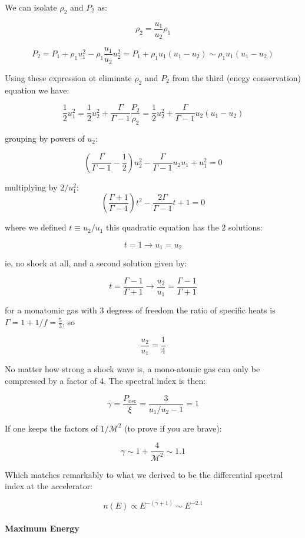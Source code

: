 \documentclass[
  letterpaper,
  DIV=11,
  numbers=noendperiod]{scrreprt}
\let\oldparagraph\paragraph
\renewcommand{\paragraph}[1]{\oldparagraph{#1}\mbox{}}
\begin{document}
We can isolate \(\rho_2\) and \(P_2\) as:

\[\rho_2 = \frac{u_1}{u_2} \rho_1\]

\[P_2 = P_1 + \rho_1 u_1^2 - \rho_1 \frac{u_1}{u_2}u_2^2 = P_1 + \rho_1 u_1 (u_1 - u_2) \sim \rho_1 u_1 (u_1 - u_2)\]

Using these expression ot eliminate \(\rho_2\) and \(P_2\) from the
third (enegy conservation) equation we have:

\[\frac{1}{2}u_1^2 = \frac{1}{2}u_2^2 + \frac{\Gamma}{\Gamma -1}\frac{P_2}{\rho_2} = \frac{1}{2}u_2^2 + \frac{\Gamma}{\Gamma -1} u_2 (u_1 - u_2)\]

grouping by powers of \(u_2\):

\[\left(\frac{\Gamma}{\Gamma -1} - \frac{1}{2}\right) u_2^2 - \frac{\Gamma}{\Gamma -1} u_2u_1 + u_1^2 = 0 \]

multiplying by \(2/u_1^2\):
\[\left(\frac{\Gamma + 1 }{\Gamma -1}\right) t^2 - \frac{2\Gamma}{\Gamma -1} t + 1 = 0\]

where we defined \(t \equiv u_2/u_1\) this quadratic equation has the 2
solutions:

\[ t = 1 \rightarrow u_1 = u_2\]

ie, no shock at all, and a second solution given by:

\[ t = \frac{\Gamma - 1}{\Gamma + 1} \rightarrow \frac{u_2}{u_1} = \frac{\Gamma - 1}{\Gamma +1}\]

for a monatomic gas with 3 degrees of freedom the ratio of specific
heats is \(\Gamma = 1 + 1/f = \frac{5}{3}\), so

\[\frac{u_2}{u_1} = \frac{1}{4}\]

No matter how strong a shock wave is, a mono-atomic gas can only be
compressed by a factor of 4. The spectral index is then:

\[\gamma = \frac{P_{esc}}{\xi} = \frac{3}{u_1/u_2 -1} = 1\]

If one keeps the factors of \(1/\mathcal{M}^2\) (to prove if you are
brave):

\[\gamma \sim 1 + \frac{4}{\mathcal{M}^2} \sim 1.1\]

Which matches remarkably to what we derived to be the differential
spectral index at the accelerator:

\[ n(E) \propto E^{-(\gamma+1)} \sim E^{-2.1} \]

\paragraph{Maximum Energy}\label{maximum-energy}
\end{document}
